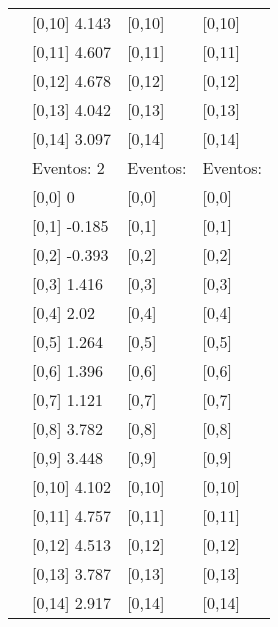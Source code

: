 \begin{table}
\begin{tabular}[t]{llll}
 & {}[0,10] 4.143 & {}[0,10] & {}[0,10]\\
 & {}[0,11] 4.607 & {}[0,11] & {}[0,11]\\
 & {}[0,12] 4.678 & {}[0,12] & {}[0,12]\\
\addlinespace
 & {}[0,13] 4.042 & {}[0,13] & {}[0,13]\\
 & {}[0,14] 3.097 & {}[0,14] & {}[0,14]\\
 & Eventos:  2 & Eventos: & Eventos:\\
 & {}[0,0] 0 & {}[0,0] & {}[0,0]\\
 & {}[0,1] -0.185 & {}[0,1] & {}[0,1]\\
\addlinespace
 & {}[0,2] -0.393 & {}[0,2] & {}[0,2]\\
 & {}[0,3] 1.416 & {}[0,3] & {}[0,3]\\
 & {}[0,4] 2.02 & {}[0,4] & {}[0,4]\\
 & {}[0,5] 1.264 & {}[0,5] & {}[0,5]\\
 & {}[0,6] 1.396 & {}[0,6] & {}[0,6]\\
\addlinespace
1000 & {}[0,7] 1.121 & {}[0,7] & {}[0,7]\\
 & {}[0,8] 3.782 & {}[0,8] & {}[0,8]\\
 & {}[0,9] 3.448 & {}[0,9] & {}[0,9]\\
 & {}[0,10] 4.102 & {}[0,10] & {}[0,10]\\
 & {}[0,11] 4.757 & {}[0,11] & {}[0,11]\\
\addlinespace
 & {}[0,12] 4.513 & {}[0,12] & {}[0,12]\\
 & {}[0,13] 3.787 & {}[0,13] & {}[0,13]\\
 & {}[0,14] 2.917 & {}[0,14] & {}[0,14]\\
\bottomrule
\end{tabular}
\end{table}
